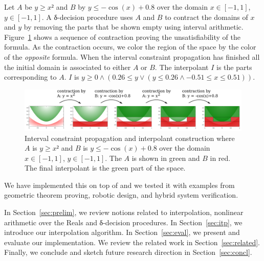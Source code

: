 \begin{example}
Let $A$ be $y≥x²$ and $B$ by $y ≤ -\cos(x) + 0.8$ over the domain $x∈[-1,1]$, $y∈[-1,1]$.
A δ-decision procedure uses $A$ and $B$ to contract the domains of $x$ and $y$ by removing the parts that be shown empty using interval arithmetic.
Figure~\ref{fig:example} shows a sequence of contraction proving the unsatisfiability of the formula.
As the contraction occurs, we color the region of the space by the color of the \emph{opposite} formula.
When the interval constraint propagation has finished all the initial domain is associated to either $A$ or $B$.
The interpolant $I$ is the parts corresponding to $A$.
$I$ is $y ≥ 0 ∧ (0.26 ≤ y ∨ (y ≤ 0.26 ∧ -0.51 ≤ x ≤ 0.51))$.

\begin{figure}
\centering
\includegraphics[scale=0.04]{img/example.pdf}
\caption{
    Interval constraint propagation and interpolant construction where $A$ is $y≥x²$ and $B$ is $y ≤ -\cos(x) + 0.8$ over the domain $x∈[-1,1]$, $y∈[-1,1]$.
    The $A$ is shown in green and $B$ in red.
    The final interpolant is the green part of the space.
}
\label{fig:example}
\end{figure}
\end{example}

We have implemented this on top of \dReal and we tested it with examples from geometric theorem proving, robotic design, and hybrid system verification.  

In Section~\ref{sec:prelim}, we review notions related to interpolation, nonlinear arithmetic over the Reals and δ-decision procedures.
In Section~\ref{sec:itp}, we introduce our interpolation algorithm.
In Section~\ref{sec:eval}, we present and evaluate our implementation.
We review the related work in Section~\ref{sec:related}.
Finally, we conclude and sketch future research direction in Section~\ref{sec:concl}.
